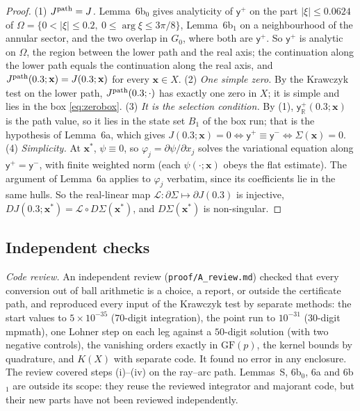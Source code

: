 \documentclass{amsart}
\numberwithin{equation}{section}
\theoremstyle{plain}
\theoremstyle{definition}
\theoremstyle{remark}
\newcommand{\bx}{\mathbf{x}}
\newcommand{\repo}[1]{\texttt{#1}}
\begin{document}
\begin{proof}
(1) \emph{$J^{\rm path} = J$.} Lemma~6b$_0$ gives analyticity of $\mathsf y^+$ on the part $|\xi| \le 0.0624$ of
$\Omega = \{0 < |\xi| \le 0.2,\ 0 \le \arg\xi \le 3\pi/8\}$, Lemma~6b$_1$ on a neighbourhood of the annular sector, and the two overlap in
$G_0$, where both are $\mathsf y^+$. So $\mathsf y^+$ is analytic on $\Omega$, the region between the lower path and the real axis; the
continuation along the lower path equals the continuation along the real axis, and $J^{\rm path}(0.3;\bx) = J(0.3;\bx)$ for every
$\bx \in X$. (2) \emph{One simple zero.} By the Krawczyk test on the lower path, $J^{\rm path}(0.3;\cdot)$ has exactly one zero in
$X$; it is simple and lies in the box \eqref{eq:zerobox}. (3) \emph{It is the selection condition.} By (1), $\mathsf y^+_{\mathbb R}(0.3;\bx)$
is the path value, so it lies in the state set $B_1$ of the box run; that is the hypothesis of Lemma~6a, which gives
$J(0.3;\bx) = 0 \Leftrightarrow \mathsf y^+ \equiv \mathsf y^- \Leftrightarrow \Sigma(\bx) = 0$. (4) \emph{Simplicity.} At $\bx^*$,
$\psi \equiv 0$, so $\varphi_j = \partial\psi/\partial x_j$ solves the variational equation along $\mathsf y^+ = \mathsf y^-$, with finite weighted norm
(each $\psi(\cdot;\bx)$ obeys the flat estimate). The argument of Lemma~6a applies to $\varphi_j$ verbatim, since its coefficients
lie in the same hulls. So the real-linear map $\mathcal L : \partial\Sigma \mapsto \partial J(0.3)$ is injective,
$DJ(0.3;\bx^*) = \mathcal L\circ D\Sigma(\bx^*)$, and $D\Sigma(\bx^*)$ is non-singular.
\end{proof}

\subsection{Independent checks}
\emph{Code review.} An independent review (\repo{proof/A\_review.md}) checked that every conversion out of ball arithmetic is a
choice, a report, or outside the certificate path, and reproduced every input of the Krawczyk test by separate methods: the
start values to $5\times10^{-35}$ ($70$-digit integration), the point run to $10^{-31}$ ($30$-digit mpmath), one Lohner step on each leg
against a $50$-digit solution (with two negative controls), the vanishing orders exactly in $\mathrm{GF}(p)$, the kernel bounds by
quadrature, and $K(X)$ with separate code. It found no error in any enclosure. The
review covered steps (i)--(iv) on the ray--arc path. Lemmas~S, 6b$_0$, 6a and 6b$_1$ are outside its scope: they reuse the
reviewed integrator and majorant code, but their new parts have not been reviewed independently.
\end{document}
